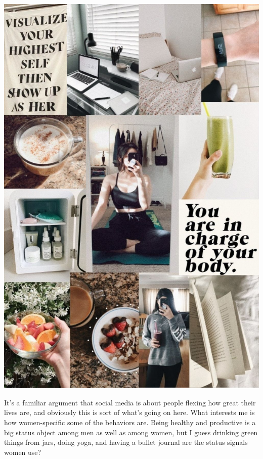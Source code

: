 \includegraphics{tg1}

It's a familiar argument that social media is about people flexing how great their lives are, and obviously this is sort of what's going on here. What interests me is how women-specific some of the behaviors are. Being healthy and productive is a big status object among men as well as among women, but I guess drinking green things from jars, doing yoga, and having a bullet journal are the status signals women use? 
\\\\




